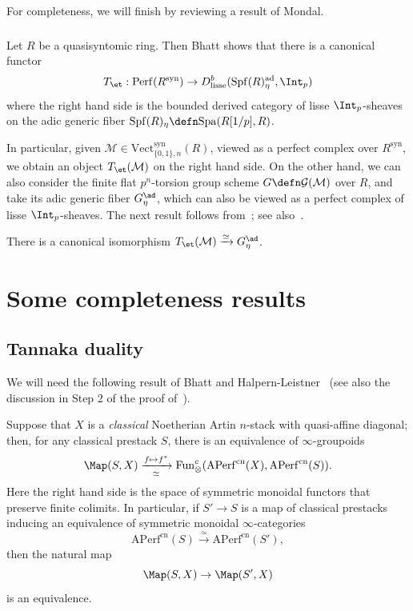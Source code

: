 \documentclass[10pt]{amsart}
\begin{document}
For completeness, we will finish by reviewing a result of Mondal.

\subsubsection{}
Let $R$ be a quasisyntomic ring. Then Bhatt shows that there is a canonical functor~\cite[Construction 6.3.1]{bhatt_lectures}
\[
T_{\et}:\mathrm{Perf}(R^{\mathrm{syn}})\to D^b_{\mathrm{lisse}}(\mathrm{Spf}(R)_\eta^{\mathrm{ad}},\Int_p)
\]
where the right hand side is the bounded derived category of lisse $\Int_p$-sheaves on the adic generic fiber $\mathrm{Spf}(R)_\eta \defn \mathrm{Spa}(R[1/p],R)$.

In particular, given $\mathcal{M}\in \mathrm{Vect}_{\{0,1\},n}^{\mathrm{syn}}(R)$, viewed as a perfect complex over $R^{\mathrm{syn}}$, we obtain an object $T_{\et}(\mathcal{M})$ on the right hand side. On the other hand, we can also consider the finite flat $p^n$-torsion group scheme $G \defn \mathcal{G}(\mathcal{M})$ over $R$, and take its adic generic fiber $G^{\ad}_{\eta}$, which can also be viewed as a perfect complex of lisse $\Int_p$-sheaves. The next result follows from~\cite[Proposition 3.99]{Mondal2024-cy}; see also~\cite[Proposition 5.25]{MR4530092}.
\begin{proposition}
\label{prop:etale_realization}
There is a canonical isomorphism $T_{\et}(\mathcal{M})\xrightarrow{\simeq}G^{\ad}_\eta$.
\end{proposition}

\appendix

\section{Some completeness results}
\label{app:completeness}

\subsection{Tannaka duality}





We will need the following result of Bhatt and Halpern-Leistner~\cite[Theorem 5.1,Lemma 3.13]{BHATT2017576} (see also the discussion in Step 2 of the proof of~\cite[Proposition 5.1.13]{MR4560539}).
\begin{theorem}
\label{thm:tannakian}
Suppose that $X$ is a \emph{classical} Noetherian Artin $n$-stack with quasi-affine diagonal; then, for any classical prestack $S$, there is an equivalence of $\infty$-groupoids
\[
\Map(S,X)\xrightarrow[\simeq]{f\mapsto f^*}\mathrm{Fun}^c_{\otimes}(\mathrm{APerf}^{\mathrm{cn}}(X),\mathrm{APerf}^{\mathrm{cn}}(S)).
\]
Here the right hand side is the space of symmetric monoidal functors that preserve finite colimits. In particular, if $S'\to S$ is a map of classical prestacks inducing an equivalence of symmetric monoidal $\infty$-categories
\[
\mathrm{APerf}^{\mathrm{cn}}(S)\xrightarrow{\simeq}\mathrm{APerf}^{\mathrm{cn}}(S'),
\]
then the natural map
\[
\Map(S,X)\to \Map(S',X)
\]
is an equivalence.
\end{theorem}
\end{document}
